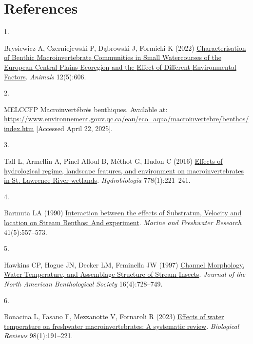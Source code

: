 \documentclass[9pt,twocolumn,twoside,]{pnas-new}
\newlength{\cslhangindent}
\newlength{\csllabelwidth}
\newenvironment{CSLReferences}[2] %
 {\begin{list}{}{%
  \setlength{\itemindent}{0pt}
  \setlength{\leftmargin}{0pt}
  \setlength{\parsep}{0pt}
  \ifodd #1
   \setlength{\leftmargin}{\cslhangindent}
   \setlength{\itemindent}{-1\cslhangindent}
  \fi
  \setlength{\itemsep}{#2\baselineskip}}}
 {\end{list}}
\newcommand{\CSLLeftMargin}[1]{\parbox[t]{\csllabelwidth}{#1}}
\newcommand{\CSLRightInline}[1]{\parbox[t]{\linewidth - \csllabelwidth}{#1}\break}
\begin{document}
\section*{References}\label{references}

\showmatmethods
\showacknow
\pnasbreak

\label{refs}
\begin{CSLReferences}{0}{1}
\CSLLeftMargin{1. }%
\CSLRightInline{Brysiewicz A, Czerniejewski P, Dąbrowski J, Formicki K
(2022) \href{https://doi.org/10.3390/ani12050606}{Characterisation of
{Benthic} {Macroinvertebrate} {Communities} in {Small} {Watercourses} of
the {European} {Central} {Plains} {Ecoregion} and the {Effect} of
{Different} {Environmental} {Factors}}. \emph{Animals} 12(5):606.}

\CSLLeftMargin{2. }%
\CSLRightInline{MELCCFP Macroinvertébrés benthiques. Available at:
\url{https://www.environnement.gouv.qc.ca/eau/eco_aqua/macroinvertebre/benthos/index.htm}
{[}Accessed April 22, 2025{]}.}

\CSLLeftMargin{3. }%
\CSLRightInline{Tall L, Armellin A, Pinel-Alloul B, Méthot G, Hudon C
(2016) \href{https://doi.org/10.1007/s10750-015-2531-7}{Effects of
hydrological regime, landscape features, and environment on
macroinvertebrates in {St}. {Lawrence} {River} wetlands}.
\emph{Hydrobiologia} 778(1):221--241.}

\CSLLeftMargin{4. }%
\CSLRightInline{Barmuta LA (1990)
\href{https://doi.org/10.1071/mf9900557}{Interaction between the effects
of {Substratun}, {Velocity} and location on {Stream} {Benthos}: And
experiment}. \emph{Marine and Freshwater Research} 41(5):557--573.}

\CSLLeftMargin{5. }%
\CSLRightInline{Hawkins CP, Hogue JN, Decker LM, Feminella JW (1997)
\href{https://doi.org/10.2307/1468167}{Channel {Morphology}, {Water}
{Temperature}, and {Assemblage} {Structure} of {Stream} {Insects}}.
\emph{Journal of the North American Benthological Society}
16(4):728--749.}

\CSLLeftMargin{6. }%
\CSLRightInline{Bonacina L, Fasano F, Mezzanotte V, Fornaroli R (2023)
\href{https://doi.org/10.1111/brv.12903}{Effects of water temperature on
freshwater macroinvertebrates: A systematic review}. \emph{Biological
Reviews} 98(1):191--221.}

\end{CSLReferences}



% 
\end{document}
